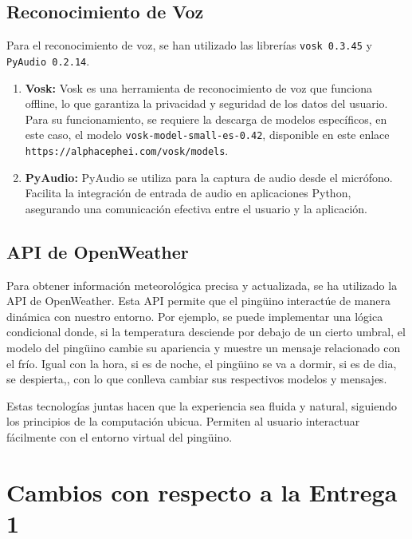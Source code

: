 \documentclass{article}
\begin{document}
	\subsection{Reconocimiento de Voz}

    Para el reconocimiento de voz, se han utilizado las librerías \texttt{vosk 0.3.45} y \texttt{PyAudio 0.2.14}. 

    \begin{enumerate}
        \item \textbf{Vosk:} 
        Vosk es una herramienta de reconocimiento de voz que funciona offline, lo que garantiza la privacidad y 
		seguridad de los datos del usuario. Para su funcionamiento, se requiere la descarga de modelos específicos,
		 en este caso, el modelo \texttt{vosk-model-small-es-0.42}, disponible en este enlace \texttt{https://alphacephei.com/vosk/models}.

        \item \textbf{PyAudio:} 
        PyAudio se utiliza para la captura de audio desde el micrófono. Facilita la integración de entrada de audio en aplicaciones Python, asegurando una comunicación efectiva entre el usuario y la aplicación.
    \end{enumerate}

	\subsection{API de OpenWeather}
	Para obtener información meteorológica precisa y actualizada, 
	se ha utilizado la API de OpenWeather. 
	Esta API permite que el pingüino interactúe de manera dinámica con 
	nuestro entorno. Por ejemplo, se puede implementar una lógica condicional 
	donde, si la temperatura desciende por debajo de un cierto umbral, 
	el modelo del pingüino cambie su apariencia y muestre un mensaje relacionado con el frío.
	Igual con la hora, si es de noche, el pingüino se va a dormir, 
	si es de dia, se despierta,, con lo que conlleva cambiar sus respectivos modelos 
	y mensajes.

\vskip 0.1in
Estas tecnologías juntas hacen que la experiencia sea fluida y natural, siguiendo los principios de la computación ubicua. Permiten al usuario interactuar fácilmente con el entorno virtual del pingüino.

\newpage

\section{Cambios con respecto a la Entrega 1}
\end{document}
